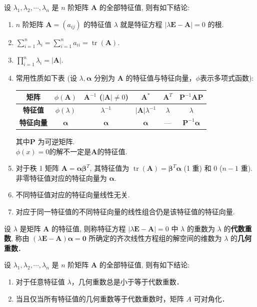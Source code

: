 \documentclass[12pt, a4paper, oneside, UTF8]{ctexbook}
\begin{document}
\begin{theorem}
    设 $\lambda_1, \lambda_2, \cdots, \lambda_n$ 是 $n$ 阶矩阵 $\bm{A}$ 的全部特征值, 则有如下结论:
	\begin{enumerate}
		\item $n$ 阶矩阵 $\bm{A}=(a_{ij})$ 的特征值 $\lambda$ 就是特征方程 $|\lambda \bm{E} - \bm{A}|=0$ 的根.
		\item $\sum_{i=1}^n \lambda_i = \sum_{i=1}^n a_{ii} = \operatorname{tr}(\bm{A})$.
		\item $\prod_{i=1}^n \lambda_i = |\bm{A}|$.
		\item 常用性质如下表 (设 $\lambda, \bm{\alpha}$ 分别为 $\bm{A}$ 的特征值与特征向量，$\phi$表示多项式函数\footnotemark):
			\begin{center}
				\begin{tabular}{|c|c|c|c|c|c|}
					\hline
					\textbf{矩阵} & $\phi(\bm{A})$ & $\bm{A}^{-1}$ ($|\bm{A}| \neq 0$) & $\bm{A}^*$ & $\bm{A}^T$ & $\bm{P}^{-1}\bm{A}\bm{P}$ \\
					\hline
					\textbf{特征值} & $\phi(\lambda)$ & $\lambda^{-1}$ & $|\bm{A}|\lambda^{-1}$ & $\lambda$ & $\lambda$ \\
					\hline
					\textbf{特征向量} & $\bm{\alpha}$ & $\bm{\alpha}$ & $\bm{\alpha}$ & — & $\bm{P}^{-1}\bm{\alpha}$ \\
					\hline
				\end{tabular}
                \begin{myRemark}
                    其中$\bm{P}$ 为可逆矩阵.\\
                    $\phi(x)=0$的解不一定是$\bm{A}$的特征值.
                \end{myRemark}
			\end{center}
		\item 对于秩 1 矩阵 $\bm{A}=\bm{\alpha}\bm{\beta}^T$, 其特征值为 $\operatorname{tr}(\bm{A})=\bm{\beta}^T\bm{\alpha}$ (1 重) 和 $0$ ($n-1$ 重). 非零特征值对应的特征向量为 $\bm{\alpha}$.
		\item 不同特征值对应的特征向量线性无关.
		\item 对应于同一特征值的不同特征向量的线性组合仍是该特征值的特征向量.
	\end{enumerate}
\end{theorem}
\begin{definition}
    设 $\lambda$ 是矩阵 $\bm{A}$ 的特征值, 则称特征方程 $|\lambda \bm{E} - \bm{A}|=0$ 中 $\lambda$ 的重数为 $\lambda$ 的\textbf{代数重数}, 称由 $(\lambda \bm{E} - \bm{A})\bm{\alpha}=\bm{0}$ 所确定的齐次线性方程组的解空间的维数为 $\lambda$ 的\textbf{几何重数}．
\end{definition}
\begin{theorem}
    设 $\lambda_1, \lambda_2, \cdots, \lambda_n$ 是 $n$ 阶矩阵 $\bm{A}$ 的全部特征值, 则有如下结论:
    \begin{enumerate}[label=\Roman*.]
        \item 对于任意特征值 $\lambda$，几何重数总是小于等于代数重数．
        \item 当且仅当所有特征值的几何重数等于代数重数时，矩阵 $A$ 可对角化．
    \end{enumerate}
    
\end{theorem}
\end{document}
